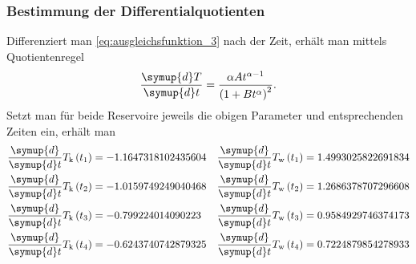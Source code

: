 

\subsubsection[]{Bestimmung der Differentialquotienten}
Differenziert man \eqref{eq:ausgleichsfunktion_3} nach der Zeit, erhält man mittels Quotientenregel
\begin{align*}
    \frac{\symup{d}T}{\symup{d}t} = \frac{\alpha A t^{\alpha -1}}{\left(1 + B t^{\alpha}\right)^2}.
\end{align*}
%
Setzt man für beide Reservoire jeweils die obigen Parameter und entsprechenden Zeiten ein, erhält man 
\begin{align*}
    \frac{\symup{d}}{\symup{d}t} T_\text{k} \left(t_1\right) &= -1.1647318102435604 &
    \frac{\symup{d}}{\symup{d}t} T_\text{w} \left(t_1\right) &=  1.4993025822691834  \\
    \frac{\symup{d}}{\symup{d}t} T_\text{k} \left(t_2\right) &= -1.0159749249040468 &
    \frac{\symup{d}}{\symup{d}t} T_\text{w} \left(t_2\right) &= 1.2686378707296608 \\
    \frac{\symup{d}}{\symup{d}t} T_\text{k} \left(t_3\right) &= -0.799224014090223 &
    \frac{\symup{d}}{\symup{d}t} T_\text{w} \left(t_3\right) &= 0.9584929746374173 \\
    \frac{\symup{d}}{\symup{d}t} T_\text{k} \left(t_4\right) &= -0.6243740742879325 &
    \frac{\symup{d}}{\symup{d}t} T_\text{w} \left(t_4\right) &= 0.7224879854278933 
\end{align*}
%

